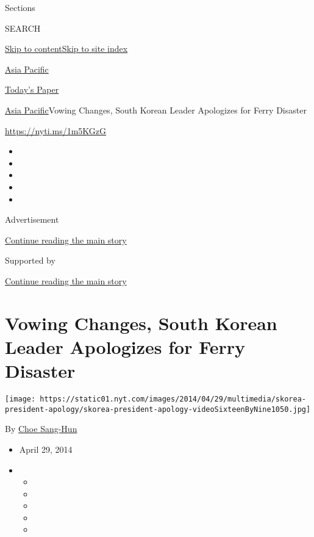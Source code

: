 Sections

SEARCH

\protect\hyperlink{site-content}{Skip to
content}\protect\hyperlink{site-index}{Skip to site index}

\href{https://www.nytimes.com/section/world/asia}{Asia Pacific}

\href{https://myaccount.nytimes.com/auth/login?response_type=cookie\&client_id=vi}{}

\href{https://www.nytimes.com/section/todayspaper}{Today's Paper}

\href{/section/world/asia}{Asia Pacific}\textbar{}Vowing Changes, South
Korean Leader Apologizes for Ferry Disaster

\url{https://nyti.ms/1m5KGzG}

\begin{itemize}
\item
\item
\item
\item
\item
\end{itemize}

Advertisement

\protect\hyperlink{after-top}{Continue reading the main story}

Supported by

\protect\hyperlink{after-sponsor}{Continue reading the main story}

\hypertarget{vowing-changes-south-korean-leader-apologizes-for-ferry-disaster}{%
\section{Vowing Changes, South Korean Leader Apologizes for Ferry
Disaster}\label{vowing-changes-south-korean-leader-apologizes-for-ferry-disaster}}

\texttt{[image: https://static01.nyt.com/images/2014/04/29/multimedia/skorea-president-apology/skorea-president-apology-videoSixteenByNine1050.jpg]}

By \href{http://www.nytimes.com/by/choe-sang-hun}{Choe Sang-Hun}

\begin{itemize}
\item
  April 29, 2014
\item
  \begin{itemize}
  \item
  \item
  \item
  \item
  \item
  \end{itemize}
\end{itemize}

